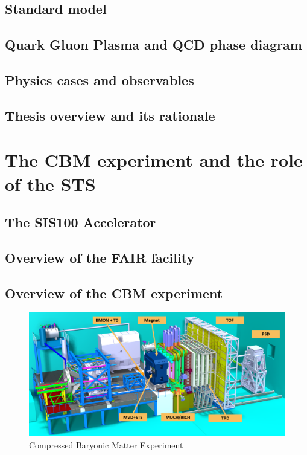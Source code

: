 \section{Standard model}
\section{Quark Gluon Plasma and QCD phase diagram}
\section{Physics cases and observables}

\section{Thesis overview and its rationale}
\chapter{The CBM experiment and the role of the STS}
\section{The SIS100 Accelerator}
\section{Overview of the FAIR facility}
\section{Overview of the CBM experiment}
\begin{figure}[!h]
    \centering
    \includegraphics[width=0.95\columnwidth]{Chapter1/images/CBMnew.png}
    \caption{Compressed Baryonic Matter Experiment}
    \label{fig:exp}
\end{figure}